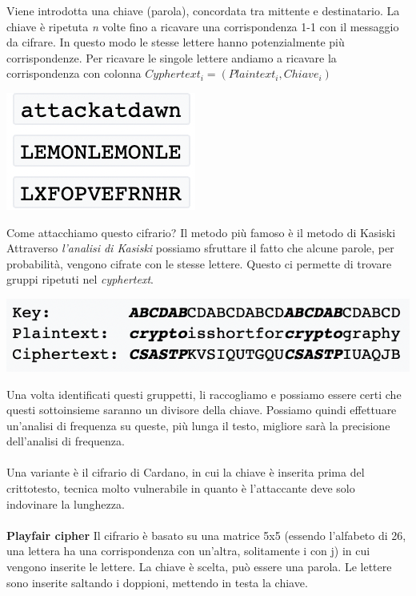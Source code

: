 \documentclass[11pt, oneside]{article}   	%
\begin{document}
Viene introdotta una chiave (parola), concordata tra mittente e destinatario. La chiave è ripetuta \emph{n} volte fino a ricavare una corrispondenza 1-1 con il messaggio da cifrare. In questo modo le stesse lettere hanno potenzialmente più corrispondenze. Per ricavare le singole lettere andiamo a ricavare la corrispondenza con colonna \(Cyphertext_i = (Plaintext_i, Chiave_i)\)
\begin{center}
\includegraphics[scale=0.7]{chiave}
\end{center}
Come attacchiamo questo cifrario? Il metodo più famoso è il metodo di Kasiski\\
Attraverso \emph{l'analisi di Kasiski} possiamo sfruttare il fatto che alcune parole, per probabilità, vengono cifrate con le stesse lettere. Questo ci permette di trovare gruppi ripetuti nel \emph{cyphertext}.
\begin{center}
\includegraphics[scale=0.7]{freq}
\end{center}
Una volta identificati questi gruppetti, li raccogliamo e possiamo essere certi che questi sottoinsieme saranno un divisore della chiave. Possiamo quindi effettuare un'analisi di frequenza su queste, più lunga il testo, migliore sarà la precisione dell'analisi di frequenza.\\\\
Una variante è il cifrario di Cardano, in cui la chiave è inserita prima del crittotesto, tecnica molto vulnerabile in quanto è l'attaccante deve solo indovinare la lunghezza.\\\\
\textbf{Playfair cipher}
Il cifrario è basato su una matrice 5x5 (essendo l'alfabeto di 26, una lettera ha una corrispondenza con un'altra, solitamente i con j) in cui vengono inserite le lettere. La chiave è scelta, può essere una parola. Le lettere sono inserite saltando i doppioni, mettendo in testa la chiave.\\
\end{document}
